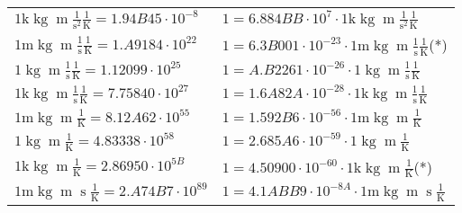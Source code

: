 \begin{center}
\begin{longtable}{l l}
{\color{gray}$1 \bm{\mathrm{ k}}\operatorname{kg}{\operatorname{m}}\frac1{\operatorname{s}^2}{}\frac1{\operatorname{K}} = 1.94B45\cdot10^{-8} $}   & {\color{gray}$ 1 = 6.884BB\cdot10^{7} \cdot 1 \bm{\mathrm{ k}}\operatorname{kg}{\operatorname{m}}\frac1{\operatorname{s}^2}{}\frac1{\operatorname{K}}$}  \\
{\color{gray}$1 \bm{\mathrm{ m}}\operatorname{kg}{\operatorname{m}}\frac1{\operatorname{s}}{}\frac1{\operatorname{K}} = 1.A9184\cdot10^{22} $}   & {\color{gray}$ 1 = 6.3B001\cdot10^{-23} \cdot 1 \bm{\mathrm{ m}}\operatorname{kg}{\operatorname{m}}\frac1{\operatorname{s}}{}\frac1{\operatorname{K}}$}\quad(*)\\
{\color{black}$1 \bm{\mathrm{ }}\operatorname{kg}{\operatorname{m}}\frac1{\operatorname{s}}{}\frac1{\operatorname{K}} = 1.12099\cdot10^{25} $}   & {\color{black}$ 1 = A.B2261\cdot10^{-26} \cdot 1 \bm{\mathrm{ }}\operatorname{kg}{\operatorname{m}}\frac1{\operatorname{s}}{}\frac1{\operatorname{K}}$}  \\
{\color{gray}$1 \bm{\mathrm{ k}}\operatorname{kg}{\operatorname{m}}\frac1{\operatorname{s}}{}\frac1{\operatorname{K}} = 7.75840\cdot10^{27} $}   & {\color{gray}$ 1 = 1.6A82A\cdot10^{-28} \cdot 1 \bm{\mathrm{ k}}\operatorname{kg}{\operatorname{m}}\frac1{\operatorname{s}}{}\frac1{\operatorname{K}}$}  \\
{\color{gray}$1 \bm{\mathrm{ m}}\operatorname{kg}{\operatorname{m}}{}{}\frac1{\operatorname{K}} = 8.12A62\cdot10^{55} $}   & {\color{gray}$ 1 = 1.592B6\cdot10^{-56} \cdot 1 \bm{\mathrm{ m}}\operatorname{kg}{\operatorname{m}}{}{}\frac1{\operatorname{K}}$}  \\
{\color{black}$1 \bm{\mathrm{ }}\operatorname{kg}{\operatorname{m}}{}{}\frac1{\operatorname{K}} = 4.83338\cdot10^{58} $}   & {\color{black}$ 1 = 2.685A6\cdot10^{-59} \cdot 1 \bm{\mathrm{ }}\operatorname{kg}{\operatorname{m}}{}{}\frac1{\operatorname{K}}$}  \\
{\color{gray}$1 \bm{\mathrm{ k}}\operatorname{kg}{\operatorname{m}}{}{}\frac1{\operatorname{K}} = 2.86950\cdot10^{5B} $}   & {\color{gray}$ 1 = 4.50900\cdot10^{-60} \cdot 1 \bm{\mathrm{ k}}\operatorname{kg}{\operatorname{m}}{}{}\frac1{\operatorname{K}}$}\quad(*)\\
{\color{gray}$1 \bm{\mathrm{ m}}\operatorname{kg}{\operatorname{m}}{\operatorname{s}}{}\frac1{\operatorname{K}} = 2.A74B7\cdot10^{89} $}   & {\color{gray}$ 1 = 4.1ABB9\cdot10^{-8A} \cdot 1 \bm{\mathrm{ m}}\operatorname{kg}{\operatorname{m}}{\operatorname{s}}{}\frac1{\operatorname{K}}$}  \\

\end{longtable}
\end{center}
